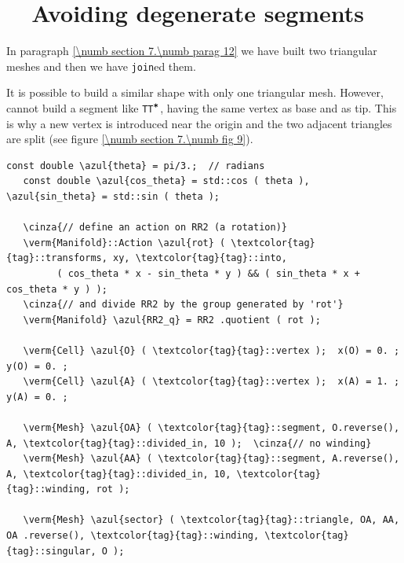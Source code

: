 \section{~~Avoiding degenerate segments}\label{\numb section 7.\numb parag 13}

In paragraph \ref{\numb section 7.\numb parag 12} we have built two triangular meshes
and then we have {\small\tt join}ed them.

It is possible to build a similar shape with only one triangular mesh.
However, {\maniFEM} cannot build a segment like {\small\tt TT$^{\mbox{\small\tt *}}$},
having the same vertex as base and as tip.
This is why a new vertex is introduced near the origin and the two adjacent triangles
are split (see figure \ref{\numb section 7.\numb fig 9}).

\begin{Verbatim}[commandchars=\\\{\},formatcom=\small\tt,frame=single,
   label=parag-\ref{\numb section 7.\numb parag 13}.cpp,rulecolor=\color{coment},
   baselinestretch=0.94,framesep=2mm                                             ]
   const double \azul{theta} = pi/3.;  // radians
   const double \azul{cos_theta} = std::cos ( theta ), \azul{sin_theta} = std::sin ( theta );
	
   \cinza{// define an action on RR2 (a rotation)}
   \verm{Manifold}::Action \azul{rot} ( \textcolor{tag}{tag}::transforms, xy, \textcolor{tag}{tag}::into,
         ( cos_theta * x - sin_theta * y ) && ( sin_theta * x + cos_theta * y ) );
   \cinza{// and divide RR2 by the group generated by 'rot'}
   \verm{Manifold} \azul{RR2_q} = RR2 .quotient ( rot );

   \verm{Cell} \azul{O} ( \textcolor{tag}{tag}::vertex );  x(O) = 0. ;  y(O) = 0. ;
   \verm{Cell} \azul{A} ( \textcolor{tag}{tag}::vertex );  x(A) = 1. ;  y(A) = 0. ;

   \verm{Mesh} \azul{OA} ( \textcolor{tag}{tag}::segment, O.reverse(), A, \textcolor{tag}{tag}::divided_in, 10 );  \cinza{// no winding}
   \verm{Mesh} \azul{AA} ( \textcolor{tag}{tag}::segment, A.reverse(), A, \textcolor{tag}{tag}::divided_in, 10, \textcolor{tag}{tag}::winding, rot );

   \verm{Mesh} \azul{sector} ( \textcolor{tag}{tag}::triangle, OA, AA, OA .reverse(), \textcolor{tag}{tag}::winding, \textcolor{tag}{tag}::singular, O );
\end{Verbatim}

